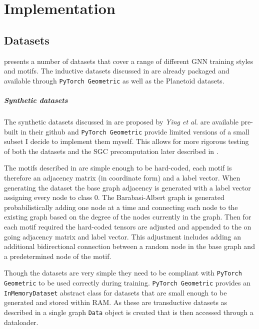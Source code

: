 \chapter{Implementation}

\section{Datasets}
\label{sec:datasets-imp}
 presents a number of datasets that cover a range of different GNN training styles and motifs.
The inductive datasets discussed in  are already packaged and available through \texttt{PyTorch Geometric}\cite{Fey/Lenssen/2019} as well as the Planetoid\cite{planetoid}\cite{citation} datasets.

\paragraph{Synthetic datasets}
The synthetic datasets discussed in  are proposed by \textit{Ying et al.}\cite{ying2019gnnexplainer} are available pre-built in their github and \texttt{PyTorch Geometric} provide limited versions of a small subset I decide to implement them myself.
This allows for more rigorous testing of both the datasets and the SGC precomputation later described in .

The motifs described in  are simple enough to be hard-coded, each motif is therefore an adjacency matrix (in coordinate form) and a label vector.
When generating the dataset the base graph adjacency is generated with a label vector assigning every node to class 0.
The Barabasi-Albert graph is generated probabilistically adding one node at a time and connecting each node to the existing graph based on the degree of the nodes currently in the graph.
Then for each motif required the hard-coded tensors are adjusted and appended to the on going adjacency matrix and label vector.
This adjustment includes adding an additional bidirectional connection between a random node in the base graph and a predetermined node of the motif.

Though the datasets are very simple they need to be compliant with \texttt{PyTorch Geometric} to be used correctly during training.
\texttt{PyTorch Geometric} provides an \texttt{InMemoryDataset} abstract class for datasets that are small enough to be generated and stored within RAM.
As these are transductive datasets as described in  a single graph \texttt{Data} object is created that is then accessed through a dataloader.

